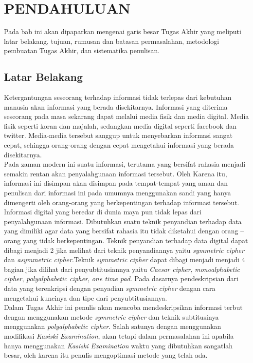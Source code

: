\chapter{PENDAHULUAN}
  Pada bab ini akan dipaparkan mengenai garis besar Tugas Akhir yang meliputi latar belakang, tujuan, rumusan dan batasan permasalahan, metodologi pembuatan Tugas Akhir, dan sistematika penulisan.
  
  \section{Latar Belakang}	
	\indent Ketergantungan seseorang terhadap informasi tidak terlepas dari kebutuhan manusia akan informasi yang berada disekitarnya. Informasi yang diterima seseorang pada masa sekarang dapat melalui media fisik dan media digital. Media fisik seperti koran dan majalah, sedangkan media digital seperti facebook dan twitter. Media-media tersebut sanggup untuk menyebarkan informasi sangat cepat, sehingga orang-orang dengan cepat mengetahui informasi yang berada disekitarnya.
    \\
    \indent Pada zaman modern ini suatu informasi, terutama yang bersifat rahasia menjadi semakin rentan akan penyalahgunaan informasi tersebut. Oleh Karena itu, informasi ini disimpan akan disimpan pada tempat-tempat yang aman dan penulisan dari informasi ini pada umumnya menggunakan sandi yang hanya dimengerti oleh orang-orang yang berkepentingan terhadap informasi tersebut.
    \\
	\indent Informasi digital yang beredar di dunia maya pun tidak lepas dari penyalahgunaan informasi. Dibutuhkan suatu teknik penyandian terhadap data yang dimiliki agar data yang bersifat rahasia itu tidak diketahui dengan orang – orang yang tidak berkepentingan. Teknik penyandian terhadap data digital dapat dibagi menjadi 2 jika melihat dari teknik penyandiannya yaitu \textit{symmetric cipher} dan \textit{asymmetric cipher}.Teknik \textit{symmetric cipher} dapat dibagi menjadi menjadi 4 bagian jika dilihat dari penyubtitusiannya yaitu \textit{Caesar cipher},\textit{ monoalphabetic cipher}, \textit{polyalphabetic cipher}, \textit{one time pad}. Pada dasarnya pendeskripsian dari data yang terenkripsi dengan penyadian \textit{symmetric cipher} dengan cara mengetahui kuncinya dan tipe dari penyubtitusiannya.
	\\
	\indent Dalam Tugas Akhir ini penulis akan mencoba mendeskripsikan informasi terbut dengan menggunakan metode \textit{symmetric cipher} dan teknik subtitusinya menggunakan \textit{polyalphabetic cipher}. Salah satunya dengan menggunakan modifikasi \textit{Kasiski Examination}, akan tetapi dalam permasalahan ini apabila hanya menggunakan \textit{Kasiski Examination} waktu yang dibutuhkan sangatlah besar, oleh karena itu penulis mengoptimasi metode yang telah ada.
    
